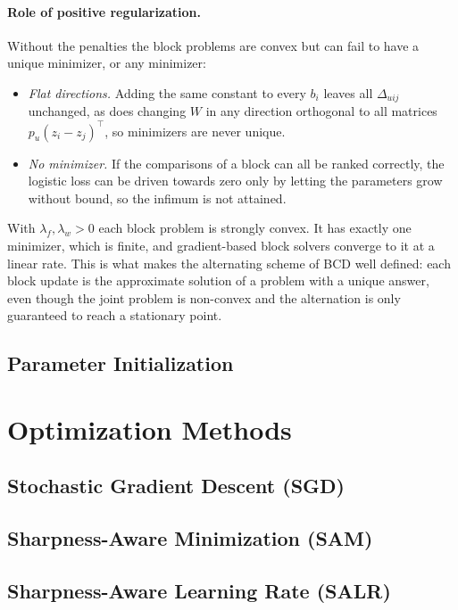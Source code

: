\documentclass[12pt,a4paper]{article}
\begin{document}
\paragraph{Role of positive regularization.} Without the penalties the block
problems are convex but can fail to have a unique minimizer, or any minimizer:
\begin{itemize}
    \item \emph{Flat directions.} Adding the same constant to every $b_i$
    leaves all $\Delta_{uij}$ unchanged, as does changing $W$ in any direction
    orthogonal to all matrices $p_u (z_i - z_j)^\top$, so minimizers are never
    unique.
    \item \emph{No minimizer.} If the comparisons of a block can all be ranked
    correctly, the logistic loss can be driven towards zero only by letting
    the parameters grow without bound, so the infimum is not attained.
\end{itemize}
With $\lambda_f, \lambda_w > 0$ each block problem is strongly convex. It has
exactly one minimizer, which is finite, and gradient-based block solvers
converge to it at a linear rate. This is what makes the alternating scheme of
BCD well defined: each block update is the approximate solution of a problem
with a unique answer, even though the joint problem is non-convex and the
alternation is only guaranteed to reach a stationary point.

\subsection{Parameter Initialization}

\section{Optimization Methods}
\label{sec:methods}

\subsection{Stochastic Gradient Descent (SGD)}
\subsection{Sharpness-Aware Minimization (SAM)}
\subsection{Sharpness-Aware Learning Rate (SALR)}
\end{document}
